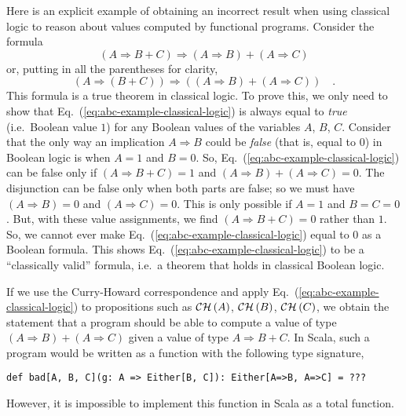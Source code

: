 Here is an explicit example of obtaining an incorrect result when
using classical logic to reason about values computed by functional
programs. Consider the formula
\begin{equation}
\left(A\Rightarrow B+C\right)\Rightarrow\left(A\Rightarrow B\right)+\left(A\Rightarrow C\right)\label{eq:abc-example-classical-logic}
\end{equation}
or, putting in all the parentheses for clarity,
\[
\left(A\Rightarrow\left(B+C\right)\right)\Rightarrow\left(\left(A\Rightarrow B\right)+\left(A\Rightarrow C\right)\right)\quad.
\]
This formula is a true theorem in classical logic. To prove this,
we only need to show that Eq.~(\ref{eq:abc-example-classical-logic})
is always equal to \emph{true} (i.e.~Boolean value $1$) for any
Boolean values of the variables $A$, $B$, $C$. Consider that the
only way an implication $A\Rightarrow B$ could be \emph{false} (that
is, equal to $0$) in Boolean logic is when $A=1$ and $B=0$. So,
Eq.~(\ref{eq:abc-example-classical-logic}) can be false only if
$\left(A\Rightarrow B+C\right)=1$ and $\left(A\Rightarrow B\right)+\left(A\Rightarrow C\right)=0$.
The disjunction can be false only when both parts are false; so we
must have $\left(A\Rightarrow B\right)=0$ and $\left(A\Rightarrow C\right)=0$.
This is only possible if $A=1$ and $B=C=0$. But, with these value
assignments, we find $\left(A\Rightarrow B+C\right)=0$ rather than
$1$. So, we cannot ever make Eq.~(\ref{eq:abc-example-classical-logic})
equal to $0$ as a Boolean formula. This shows Eq.~(\ref{eq:abc-example-classical-logic})
to be a ``classically valid'' formula, i.e.~a theorem that holds
in classical Boolean logic.

If we use the Curry-Howard correspondence and apply Eq.~(\ref{eq:abc-example-classical-logic})
to propositions such as ${\cal CH}\left(A\right)$, ${\cal CH}\left(B\right)$,
${\cal CH}\left(C\right)$, we obtain the statement that a program
should be able to compute a value of type $\left(A\Rightarrow B\right)+\left(A\Rightarrow C\right)$
given a value of type $A\Rightarrow B+C$. In Scala, such a program
would be written as a function with the following type signature,
\begin{lstlisting}
def bad[A, B, C](g: A => Either[B, C]): Either[A=>B, A=>C] = ???
\end{lstlisting}
However, it is impossible to implement this function in Scala as a
total function.

